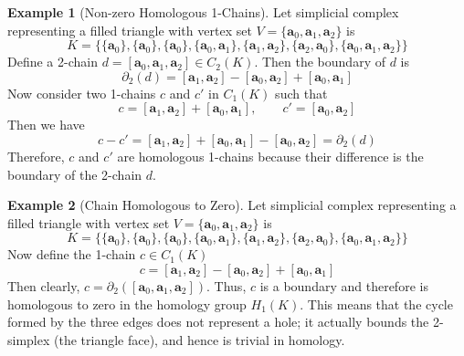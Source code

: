 \documentclass[12pt,oneside,reqno]{amsart}
\theoremstyle{plain}
\theoremstyle{definition}
\newtheorem{example}{Example}[section]
\theoremstyle{remark}
\newcommand{\0}{{\textbf{0}}}
\begin{document}
\begin{example}[Non-zero Homologous 1-Chains]\label{eg:Non-zero Homologous 1-Chains}
Let simplicial complex representing a filled triangle with vertex set $V = \{\bm{a}_0, \bm{a}_1, \bm{a}_2\}$ is 
\[K = \{\{\bm{a}_0\}, \{\bm{a}_0\}, \{\bm{a}_0\}, \{\bm{a}_0, \bm{a}_1\}, \{\bm{a}_1, \bm{a}_2\}, \{\bm{a}_2, \bm{a}_0\}, \{\bm{a}_0, \bm{a}_1, \bm{a}_2\}\} \]
Define a 2-chain $d = [\bm{a}_0, \bm{a}_1, \bm{a}_2] \in C_2(K)$. Then the boundary of $d$ is
\[\partial_2(d) = [\bm{a}_1, \bm{a}_2] - [\bm{a}_0, \bm{a}_2] + [\bm{a}_0, \bm{a}_1]\]
Now consider two 1-chains $c$ and $c'$ in $C_{1}(K)$ such that 
\[c = [\bm{a}_1, \bm{a}_2] + [\bm{a}_0, \bm{a}_1], \qquad c' = [\bm{a}_0, \bm{a}_2]\]
Then we have
\[c - c' = [\bm{a}_1,\bm{a}_2] + [\bm{a}_0,\bm{a}_1] - [\bm{a}_0,\bm{a}_2] = \partial_2(d)\]
Therefore, $c$ and $c'$ are homologous 1-chains because their difference is the boundary of the 2-chain $d$.
\end{example}

\begin{example}[Chain Homologous to Zero]\label{eg:Chain Homologous to Zero}
Let simplicial complex representing a filled triangle with vertex set $V = \{\bm{a}_0, \bm{a}_1, \bm{a}_2\}$ is 
\[K = \{\{\bm{a}_0\}, \{\bm{a}_0\}, \{\bm{a}_0\}, \{\bm{a}_0, \bm{a}_1\}, \{\bm{a}_1, \bm{a}_2\}, \{\bm{a}_2, \bm{a}_0\}, \{\bm{a}_0, \bm{a}_1, \bm{a}_2\}\} \]
Now define the 1-chain $c \in C_{1}(K)$
\[
c = [\bm{a}_1, \bm{a}_2] - [\bm{a}_0, \bm{a}_2] + [\bm{a}_0, \bm{a}_1]
\]
Then clearly, $c = \partial_2([\bm{a}_0, \bm{a}_1, \bm{a}_2])$. Thus, $c$ is a boundary and therefore is homologous to zero in the homology group $H_1(K)$. This means that the cycle formed by the three edges does not represent a hole; it actually bounds the 2-simplex (the triangle face), and hence is trivial in homology.
\end{example}
\end{document}
